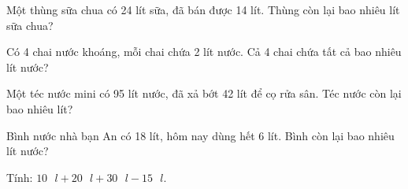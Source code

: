 \begin{ex}
Một thùng sữa chua có 24 lít sữa, đã bán được 14 lít. Thùng còn lại bao nhiêu lít sữa chua?
\end{ex}

\begin{ex}
Có 4 chai nước khoáng, mỗi chai chứa 2 lít nước. Cả 4 chai chứa tất cả bao nhiêu lít nước?
\end{ex}

\begin{ex}
Một téc nước mini có 95 lít nước, đã xả bớt 42 lít để cọ rửa sân. Téc nước còn lại bao nhiêu lít?
\end{ex}

\begin{ex}
Bình nước nhà bạn An có 18 lít, hôm nay dùng hết 6 lít. Bình còn lại bao nhiêu lít nước?
\end{ex}

\begin{ex}
Tính: $10\text{ }l + 20\text{ }l + 30\text{ }l - 15\text{ }l$.
\end{ex}
